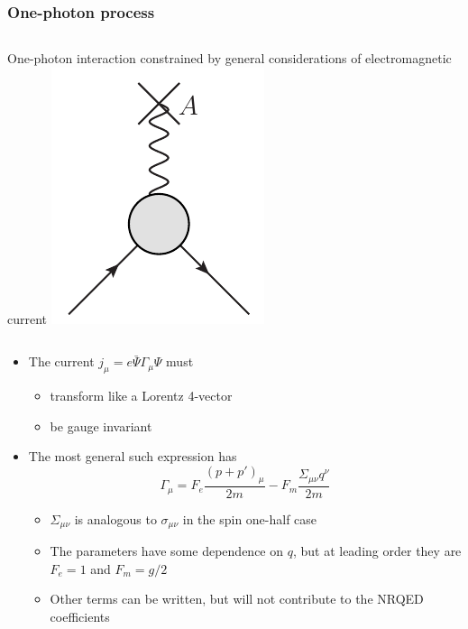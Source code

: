 \documentclass[11ppt]{beamer}
\begin{document}
\begin{frame}
\frametitle{One-photon process}

    \begin{columns}[c] 
One-photon interaction constrained by general considerations of electromagnetic current
\includegraphics[scale=0.4]{../eps/QED-static-field-blob}
    \end{columns}

\begin{itemize}

	\item 	The current $j_\mu = e\bar{\Psi}\Gamma_\mu \Psi$ must
	\begin{itemize}
		\item	transform like a Lorentz 4-vector
		\item	be gauge invariant
	\end{itemize}
	\item	The most general such expression has
\scriptsize\[	\Gamma_\mu = F_e \frac{(p + p' )_\mu}{2m}  - F_m \frac{ \Sigma_{\mu\nu} q^\nu}{2m}	\]\normalsize
	\begin{itemize}
		\item $\Sigma_{\mu \nu}$ is analogous to $\sigma_{\mu\nu}$ in the spin one-half case
		\item The parameters have some dependence on $q$, but at leading order they are $F_e = 1$ and $F_m = g/2$
		\item Other terms can be written, but will not contribute to the NRQED coefficients 
	\end{itemize}
\end{itemize}




\end{frame}
\end{document}
